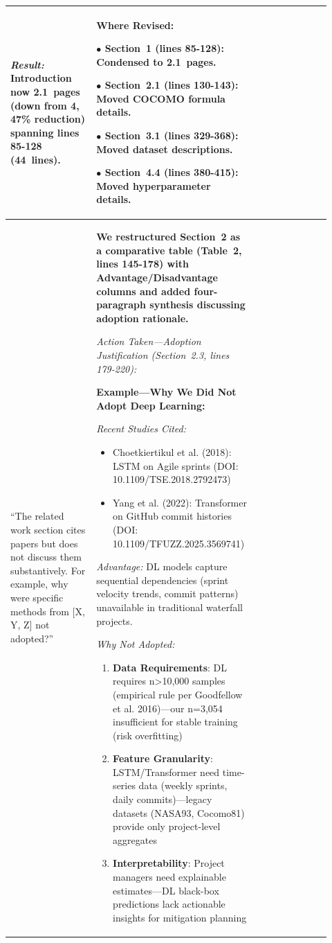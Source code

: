 \documentclass[11pt,a4paper]{article}
\begin{document}
\begin{longtable}{>{\raggedright\arraybackslash}p{0.26\linewidth}|>{\raggedright\arraybackslash}p{0.44\linewidth}|>{\raggedright\arraybackslash}p{0.22\linewidth}}
\textit{Result:} Introduction now 2.1~pages (down from 4, 47\% reduction) spanning lines 85-128 (44~lines). &

\textbf{Where Revised:}

$\bullet$ \textbf{Section~1} (lines 85-128): Condensed to 2.1~pages.

$\bullet$ \textbf{Section~2.1} (lines 130-143): Moved COCOMO formula details.

$\bullet$ \textbf{Section~3.1} (lines 329-368): Moved dataset descriptions.

$\bullet$ \textbf{Section~4.4} (lines 380-415): Moved hyperparameter details. \\

\midrule

``The related work section cites papers but does not discuss them substantively. For example, why were specific methods from [X, Y, Z] not adopted?'' &

\textbf{We restructured Section~2 as a comparative table (Table~2, lines 145-178) with Advantage/Disadvantage columns and added four-paragraph synthesis discussing adoption rationale.}

\textit{Action Taken---Adoption Justification (Section~2.3, lines 179-220):}

\textbf{Example---Why We Did Not Adopt Deep Learning:}

\textit{Recent Studies Cited:}
\begin{itemize}
    \item Choetkiertikul et al. (2018): LSTM on Agile sprints (DOI: 10.1109/TSE.2018.2792473)
    \item Yang et al. (2022): Transformer on GitHub commit histories (DOI: 10.1109/TFUZZ.2025.3569741)
\end{itemize}

\textit{Advantage:} DL models capture sequential dependencies (sprint velocity trends, commit patterns) unavailable in traditional waterfall projects.

\textit{Why Not Adopted:}
\begin{enumerate}
    \item \textbf{Data Requirements}: DL requires n>10,000 samples (empirical rule per Goodfellow et al. 2016)---our n=3,054 insufficient for stable training (risk overfitting)
    \item \textbf{Feature Granularity}: LSTM/Transformer need time-series data (weekly sprints, daily commits)---legacy datasets (NASA93, Cocomo81) provide only project-level aggregates
    \item \textbf{Interpretability}: Project managers need explainable estimates---DL black-box predictions lack actionable insights for mitigation planning
\end{enumerate}


\end{longtable}
\end{document}
